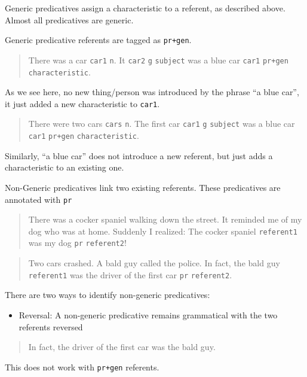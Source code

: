 \documentclass[
]{book}
\providecommand{\tightlist}{%
  \setlength{\itemsep}{0pt}\setlength{\parskip}{0pt}}
\begin{document}
Generic predicatives assign a characteristic to a referent,
as described above.
Almost all predicatives are generic.

Generic predicative referents are tagged as \texttt{pr+gen}.

\begin{quote}
There was a car \texttt{car1} \texttt{n}.
It \texttt{car2} \texttt{g} \texttt{subject} was a blue car \texttt{car1} \texttt{pr+gen} \texttt{characteristic}.
\end{quote}

As we see here, no new thing/person was introduced by the phrase ``a blue car'', it just added a new characteristic to \texttt{car1}.

\begin{quote}
There were two cars \texttt{cars} \texttt{n}.
The first car \texttt{car1} \texttt{g} \texttt{subject} was a blue car \texttt{car1} \texttt{pr+gen} \texttt{characteristic}.
\end{quote}

Similarly, ``a blue car'' does not introduce a new referent, but just adds a characteristic to an existing one.

Non-Generic predicatives link two existing referents.
These predicatives are annotated with \texttt{pr}

\begin{quote}
There was a cocker spaniel walking down the street.
It reminded me of my dog who was at home.
Suddenly I realized:
The cocker spaniel \texttt{referent1} was my dog \texttt{pr} \texttt{referent2}!
\end{quote}

\begin{quote}
Two cars crashed.
A bald guy called the police.
In fact, the bald guy \texttt{referent1}
was the driver of the first car \texttt{pr} \texttt{referent2}.
\end{quote}

There are two ways to identify non-generic predicatives:

\begin{itemize}
\tightlist
\item
  Reversal: A non-generic predicative remains grammatical
  with the two referents reversed
\end{itemize}

\begin{quote}
In fact, the driver of the first car was the bald guy.
\end{quote}

This does not work with \texttt{pr+gen} referents.
\end{document}
